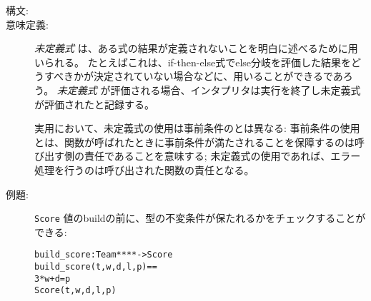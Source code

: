 \documentclass[\pformat,12pt]{jarticle}
\begin{document}
\begin{description}
\item[構文:]

  
\item[意味定義:] {\it 未定義式} は、ある式の結果が定義されないことを明白に述べるために用いられる。
 たとえばこれは、if-then-else式でelse分岐を評価した結果をどうすべきかが決定されていない場合などに、用いることができるであろう。
{\it 未定義式} が評価される場合、インタプリタは実行を終了し未定義式が評価されたと記録する。

実用において、未定義式の使用は事前条件のとは異なる:
事前条件の使用とは、関数が呼ばれたときに事前条件が満たされることを保障するのは呼び出す側の責任であることを意味する;
未定義式の使用であれば、エラー処理を行うのは呼び出された関数の責任となる。

\item[例題:] \texttt{Score} 値のbuildの前に、型の不変条件が保たれるかをチェックすることができる:

  \begin{alltt}
  build_score : Team *  *  *  *  -> Score
  build_score (t,w,d,l,p) ==
     3 * w + d = p
     Score(t,w,d,l,p)
  \end{alltt}
\end{description}
\end{document}
